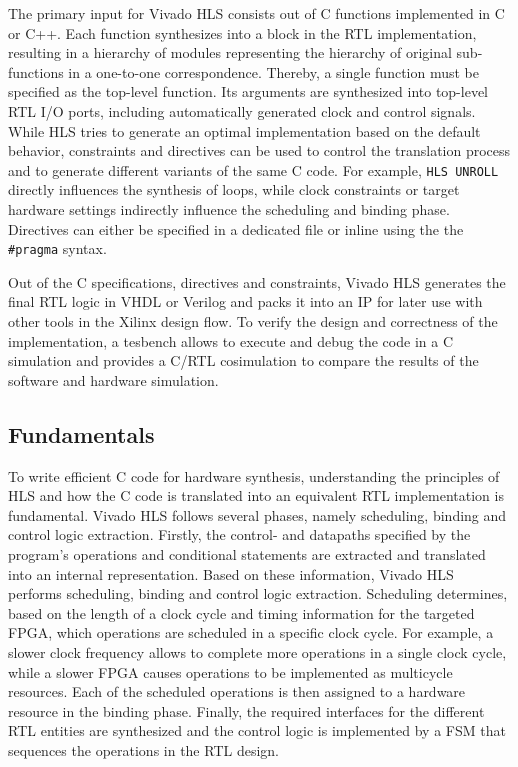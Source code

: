 The primary input for Vivado \ac{HLS} consists out of C functions implemented
in C or C++. Each function synthesizes into a block in the \ac{RTL}
implementation, resulting in a hierarchy of modules representing the hierarchy
of original sub-functions in a one-to-one correspondence. Thereby, a single
function must be specified as the top-level function. Its arguments are
synthesized into top-level \ac{RTL} I/O ports, including automatically
generated clock and control signals. While \ac{HLS} tries to generate an
optimal implementation based on the default behavior, constraints and
directives can be used to control the translation process and to generate
different variants of the same C code. For example, \lstinline{HLS UNROLL}
directly influences the synthesis of loops, while clock constraints or target
hardware settings indirectly influence the scheduling and binding phase.
Directives can either be specified in a dedicated file or inline using the the
\lstinline{#pragma} syntax.

Out of the C specifications, directives and constraints, Vivado \ac{HLS}
generates the final \ac{RTL} logic in \ac{VHDL} or Verilog and packs it into
an \ac{IP} for later use with other tools in the Xilinx design flow. To verify
the design and correctness of the implementation, a tesbench allows to execute
and debug the code in a C simulation and provides a C/RTL cosimulation to
compare the results of the software and hardware simulation.

\subsection{Fundamentals}
To write efficient C code for hardware synthesis, understanding the principles
of \ac{HLS} and how the C code is translated into an equivalent \ac{RTL}
implementation is fundamental. Vivado \ac{HLS} follows several phases, namely
scheduling, binding and control logic extraction. Firstly, the control- and
datapaths specified by the program's operations and conditional statements are
extracted and translated into an internal representation. Based on these
information, Vivado HLS performs scheduling, binding and control logic
extraction. Scheduling determines, based on the length of a clock cycle and
timing information for the targeted \ac{FPGA}, which operations are scheduled
in a specific clock cycle. For example, a slower clock frequency allows to
complete more operations in a single clock cycle, while a slower \ac{FPGA}
causes operations to be implemented as multicycle resources. Each of the
scheduled operations is then assigned to a hardware resource in the binding
phase. Finally, the required interfaces for the different \ac{RTL} entities
are synthesized and the control logic is implemented by a \ac{FSM} that
sequences the operations in the \ac{RTL} design.

